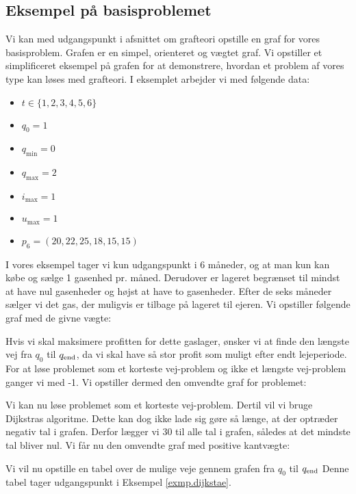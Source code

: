 \subsection{Eksempel på basisproblemet} \label{kap:graf_basis}
Vi kan med udgangspunkt i afsnittet om grafteori opstille en graf for vores basisproblem. Grafen er en simpel, orienteret og vægtet graf. Vi opstiller et simplificeret eksempel på grafen for at demonstrere, hvordan et problem af vores type kan løses med grafteori. I eksemplet arbejder vi med følgende data:
\begin{itemize}
  \item $t \in \{1,2,3,4,5,6\}$
  \item $q_{0}=1$
  \item $q_{\min}=0$
  \item $q_{\max}=2$
  \item $i_{\max}=1$
  \item $u_{\max}=1$
  \item $p_{6}=(20,22,25,18,15,15)$
\end{itemize}

I vores eksempel tager vi kun udgangspunkt i 6 måneder, og at man kun kan købe og sælge 1 gasenhed pr. måned. Derudover er lageret begrænset til mindst at have nul gasenheder og højst at have to gasenheder. Efter de seks måneder sælger vi det gas, der muligvis er tilbage på lageret til ejeren. Vi opstiller følgende graf med de givne vægte:



Hvis vi skal maksimere profitten for dette gaslager, ønsker vi at finde den længste vej fra $q_{0}$ til $q_{\textrm{end}}$, da vi skal have så stor profit som muligt efter endt lejeperiode. For at løse problemet som et korteste vej-problem og ikke et længste vej-problem ganger vi med -1. Vi opstiller dermed den omvendte graf for problemet:



Vi kan nu løse problemet som et korteste vej-problem. Dertil vil vi bruge Dijkstras algoritme. Dette kan dog ikke lade sig gøre så længe, at der optræder negativ tal i grafen. Derfor lægger vi 30 til alle tal i grafen, således at det mindste tal bliver nul. Vi får nu den omvendte graf med positive kantvægte:




Vi vil nu opstille en tabel over de mulige veje gennem grafen fra $q_0$ til $q_{\textrm{end}}$ Denne tabel tager udgangspunkt i Eksempel \ref{exmp.dijkstae}.

